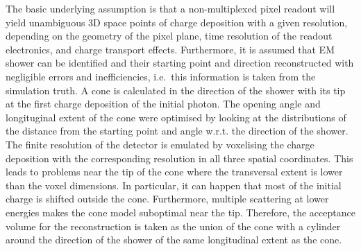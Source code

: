 The basic underlying assumption is that a non-multiplexed pixel readout will yield unambiguous 3D space points of charge deposition with a given resolution, depending on the geometry of the pixel plane, time resolution of the readout electronics, and charge transport effects.
Furthermore, it is assumed that EM shower can be identified and their starting point and direction reconstructed with negligible errors and inefficiencies, i.e.\ this information is taken from the simulation truth.
A cone is calculated in the direction of the shower with its tip at the first charge deposition of the initial photon.
The opening angle and longituginal extent of the cone were optimised by looking at the distributions of the distance from the starting point and angle w.r.t. the direction of the shower.
The finite resolution of the detector is emulated by voxelising the charge deposition with the corresponding resolution in all three spatial coordinates.
This leads to problems near the tip of the cone where the transversal extent is lower than the voxel dimensions.
In particular, it can happen that most of the initial charge is shifted outside the cone.
Furthermore, multiple scattering at lower energies makes the cone model suboptimal near the tip.
Therefore, the acceptance volume for the reconstruction is taken as the union of the cone with a cylinder around the direction of the shower of the same longitudinal extent as the cone.

